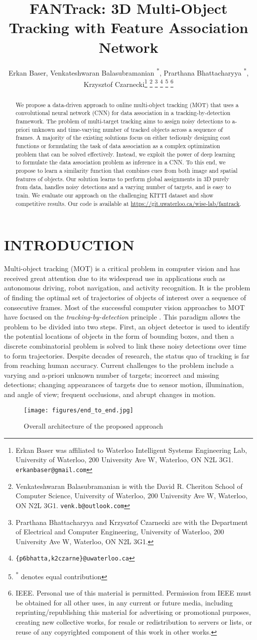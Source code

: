\documentclass[letterpaper, 10 pt, conference]{ieeeconf}
\title{\LARGE \bf
FANTrack: 3D Multi-Object Tracking with Feature Association Network
}
\author{Erkan Baser, Venkateshwaran Balasubramanian \textsuperscript{*}, Prarthana Bhattacharyya \textsuperscript{*}, Krzysztof Czarnecki\thanks{ Erkan Baser was affiliated to Waterloo Intelligent Systems Engineering Lab, University of Waterloo, 200 University Ave W, Waterloo, ON N2L 3G1. {\tt\small erkanbaser@gmail.com}}
\thanks{ Venkateshwaran Balasubramanian is with the David R. Cheriton School of Computer Science, University of Waterloo, 200 University Ave W, Waterloo, ON N2L 3G1. {\tt\small venk.b@outlook.com}}
\thanks{ Prarthana Bhattacharyya and Krzysztof Czarnecki are with the Department of Electrical and Computer Engineering, University of Waterloo, 200 University Ave W, Waterloo, ON N2L 3G1.}
\thanks{{\tt\small \{p6bhatta,k2czarne\}@uwaterloo.ca}}
\thanks{\textsuperscript{*} denotes equal contribution}
\thanks{\newline \textcopyright \enspace 2019 IEEE. Personal use of this material is permitted. Permission from IEEE must be obtained for all other uses, in any current or future media, including reprinting/republishing this material for advertising or promotional purposes, creating new collective works, for resale or redistribution to servers or lists, or reuse of any copyrighted component of this work in other works.}
}
\begin{document}
\maketitle
\pagestyle{empty}


\begin{abstract}
We propose a data-driven approach to online multi-object tracking (MOT) that uses a convolutional neural network (CNN) for data association in a tracking-by-detection framework. The problem of multi-target tracking aims to assign noisy detections to a-priori unknown and time-varying number of tracked objects across a sequence of frames. A majority of the existing solutions focus on either tediously designing cost functions or formulating the task of data association as a complex optimization problem that can be solved effectively. Instead, we exploit the power of deep learning to formulate the data association problem as inference in a CNN. To this end, we propose to learn a similarity function that combines cues from both image and spatial features of objects. Our solution learns to perform global assignments in 3D purely from data, handles noisy detections and a varying number of targets, and is easy to train. We evaluate our approach on the challenging KITTI dataset and show competitive results. Our code is available at \url{https://git.uwaterloo.ca/wise-lab/fantrack}.
\end{abstract}


\section{INTRODUCTION}
Multi-object tracking (MOT) is a critical problem in computer vision and has received great attention due to its widespread use in applications such as autonomous driving, robot navigation, and activity recognition. It is the problem of finding the optimal set of trajectories of objects of interest over a sequence of consecutive frames. Most of the successful computer vision approaches to MOT have focused on the \textit{tracking-by-detection} principle \cite{Okuma2004ABP, trackdet}. This paradigm allows the problem to be divided into two steps. First, an object detector is used to identify the potential locations of objects in the form of bounding boxes, and then a discrete combinatorial problem is solved to link these noisy detections over time to form trajectories. Despite decades of research, the status quo of tracking is far from reaching human accuracy. Current challenges to the problem include a varying and a-priori unknown number of targets; incorrect and missing detections; changing appearances of targets due to sensor motion, illumination, and angle of view; frequent occlusions, and abrupt changes in motion.
\begin{figure}[t]
\begin{center}
\texttt{[image: figures/end\_to\_end.jpg]}
\end{center}
\caption{Overall architecture of the proposed approach}
\label{end_to_end}
\end{figure}
\end{document}
